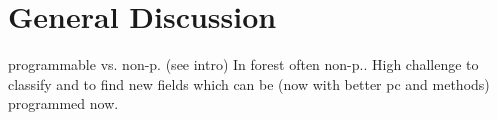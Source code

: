 \chapter{General Discussion}
\label{chap:discussion}
programmable vs. non-p. (see intro) In forest often non-p.. High challenge to classify and to find new fields which can be (now with better pc and methods) programmed now.